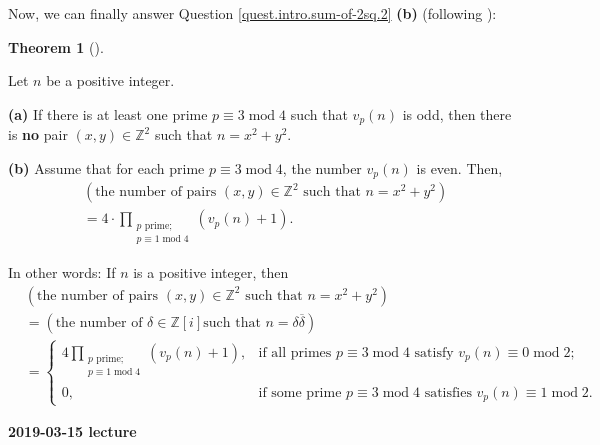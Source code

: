 \documentclass[numbers=enddot,12pt,final,onecolumn,notitlepage]{scrartcl}%
\numberwithin{exer}{subsection}
\theoremstyle{definition}
\newtheorem{theo}{Theorem}[subsection]
\newenvironment{theorem}[1][]
{\begin{theo}[#1]\begin{leftbar}}
{\end{leftbar}\end{theo}}
\let\prodnonlimits\prod
\renewcommand{\prod}{\prodnonlimits\limits}
\newenvironment{noncompile}{}{}
\begin{document}
Now, we can finally answer Question \ref{quest.intro.sum-of-2sq.2}
\textbf{(b)} (following \cite[\S 8.3, Corollary 19]{Dummit-Foote}):

\begin{theorem}
\label{thm.Z[i].count-xx+yy}Let $n$ be a positive integer.

\textbf{(a)} If there is at least one prime $p\equiv3\operatorname{mod}4$ such
that $v_{p}\left(  n\right)  $ is odd, then there is \textbf{no} pair $\left(
x,y\right)  \in\mathbb{Z}^{2}$ such that $n=x^{2}+y^{2}$.

\textbf{(b)} Assume that for each prime $p\equiv3\operatorname{mod}4$, the
number $v_{p}\left(  n\right)  $ is even. Then,%
\begin{align*}
&  \left(  \text{the number of pairs }\left(  x,y\right)  \in\mathbb{Z}%
^{2}\text{ such that }n=x^{2}+y^{2}\right) \\
&  =4\cdot\prod_{\substack{p\text{ prime;}\\p\equiv1\operatorname{mod}%
4}}\left(  v_{p}\left(  n\right)  +1\right)  .
\end{align*}

\end{theorem}

\begin{noncompile}
In other words: If $n$ is a positive integer, then%
\begin{align*}
&  \left(  \text{the number of pairs }\left(  x,y\right)  \in\mathbb{Z}%
^{2}\text{ such that }n=x^{2}+y^{2}\right) \\
&  =\left(  \text{the number of }\delta\in\mathbb{Z}\left[  i\right]  \text{
such that }n=\delta\overline{\delta}\right) \\
&  =%
\begin{cases}
4\prod_{\substack{p\text{ prime;}\\p\equiv1\operatorname{mod}4}}\left(
v_{p}\left(  n\right)  +1\right)  , & \text{if all primes }p\equiv
3\operatorname{mod}4\text{ satisfy }v_{p}\left(  n\right)  \equiv
0\operatorname{mod}2;\\
0, & \text{if some prime }p\equiv3\operatorname{mod}4\text{ satisfies }%
v_{p}\left(  n\right)  \equiv1\operatorname{mod}2.
\end{cases}
\end{align*}

\end{noncompile}

\begin{center}
\textbf{2019-03-15 lecture}
\end{center}
\end{document}
